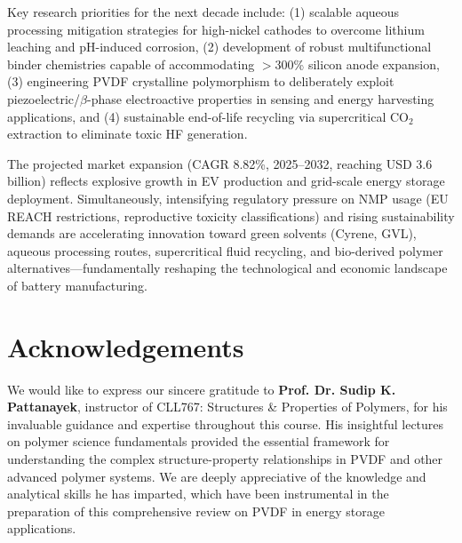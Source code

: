 \documentclass[12pt,a4paper]{article}
\begin{document}
Key research priorities for the next decade include: (1) scalable aqueous processing mitigation strategies for high-nickel cathodes to overcome lithium leaching and pH-induced corrosion, (2) development of robust multifunctional binder chemistries capable of accommodating $>$300\% silicon anode expansion, (3) engineering PVDF crystalline polymorphism to deliberately exploit piezoelectric/$\beta$-phase electroactive properties in sensing and energy harvesting applications, and (4) sustainable end-of-life recycling via supercritical CO$_2$ extraction to eliminate toxic HF generation.

The projected market expansion (CAGR 8.82\%, 2025--2032, reaching USD 3.6 billion) reflects explosive growth in EV production and grid-scale energy storage deployment.\citep{ref51} Simultaneously, intensifying regulatory pressure on NMP usage (EU REACH restrictions, reproductive toxicity classifications) and rising sustainability demands are accelerating innovation toward green solvents (Cyrene, GVL), aqueous processing routes, supercritical fluid recycling, and bio-derived polymer alternatives—fundamentally reshaping the technological and economic landscape of battery manufacturing.

\newpage
\section*{Acknowledgements}
\noindent We would like to express our sincere gratitude to \textbf{Prof. Dr. Sudip K. Pattanayek}, instructor of CLL767: Structures \& Properties of Polymers, for his invaluable guidance and expertise throughout this course. His insightful lectures on polymer science fundamentals provided the essential framework for understanding the complex structure-property relationships in PVDF and other advanced polymer systems. We are deeply appreciative of the knowledge and analytical skills he has imparted, which have been instrumental in the preparation of this comprehensive review on PVDF in energy storage applications.



\end{document}
